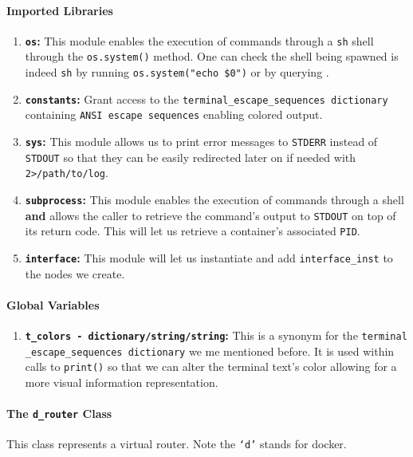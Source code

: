     \paragraph{Imported Libraries}
        \begin{enumerate}
            \item \textbf{\texttt{os}:} This module enables the execution of commands through a \texttt{sh} shell through the \texttt{os.system()} method. One can check the shell being spawned is indeed \texttt{sh} by running \texttt{\allowbreak os.system("echo \$0")} or by querying \cite{bib:man-system}.
            \item \textbf{\texttt{constants}:} Grant access to the \texttt{\allowbreak terminal\_escape\_sequences dictionary} containing \texttt{ANSI escape sequences} enabling colored output.
            \item \textbf{\texttt{sys}:} This module allows us to print error messages to \texttt{STDERR} instead of \texttt{STDOUT} so that they can be easily redirected later on if needed with \texttt{2>/path/to/log}.
            \item \textbf{\texttt{subprocess}:} This module enables the execution of commands through a shell \textbf{and} allows the caller to retrieve the command's output to \texttt{STDOUT} on top of its return code. This will let us retrieve a container's associated \texttt{PID}.
            \item \textbf{\texttt{interface}:} This module will let us instantiate and add \texttt{interface\_inst} to the nodes we create.
        \end{enumerate}

    \paragraph{Global Variables}
        \begin{enumerate}
            \item \textbf{\texttt{\allowbreak t\_colors - dictionary/string/string}:} This is a synonym for the \texttt{\allowbreak terminal \_escape\_sequences dictionary} we me mentioned before. It is used within calls to \texttt{print()} so that we can alter the terminal text's color allowing for a more visual information representation.
        \end{enumerate}

    \paragraph{The \texttt{d\_router} Class}
        This class represents a virtual router. Note the \texttt{`d'} stands for docker.

